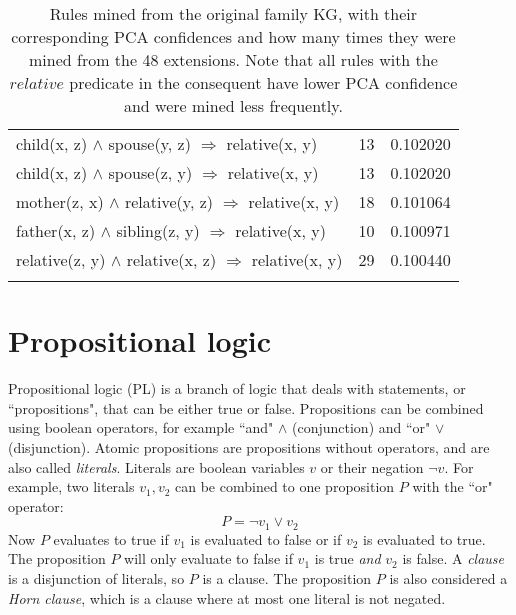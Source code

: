 \begin{longtable}{lrr}
     child(x, z) $\wedge$ spouse(y, z)   $\Rightarrow$ relative(x, y) &           13 &        0.102020 \\
     child(x, z) $\wedge$ spouse(z, y)   $\Rightarrow$ relative(x, y) &           13 &        0.102020 \\
  mother(z, x) $\wedge$ relative(y, z)   $\Rightarrow$ relative(x, y) &           18 &        0.101064 \\
   father(x, z) $\wedge$ sibling(z, y)   $\Rightarrow$ relative(x, y) &           10 &        0.100971 \\
relative(z, y) $\wedge$ relative(x, z)   $\Rightarrow$ relative(x, y) &           29 &        0.100440 \\
\bottomrule
\caption[Rules mined from the original family KG]{Rules mined from the original family KG, with their corresponding PCA confidences and how many times they were mined from the 48 extensions. Note that all rules with the $relative$ predicate in the consequent have lower PCA confidence and were mined less frequently.}
\label{family_original_rules_table_PCA}
\end{longtable}


\section{Propositional logic}
\label{propositional_logic}
Propositional logic (PL) is a branch of logic that deals with statements, or ``propositions", that can be either true or false. Propositions can be combined using boolean operators, for example ``and" $\wedge$ (conjunction) and ``or" $\vee$ (disjunction). Atomic propositions are propositions without operators, and are also called \textit{literals}. Literals are boolean variables $v$ or their negation $\neg v$. For example, two literals $v_1, v_2$ can be combined to one proposition $P$ with the ``or" operator:
\[P = \neg v_1 \vee v_2\]
Now $P$ evaluates to true if $v_1$ is evaluated to false or if $v_2$ is evaluated to true. The proposition $P$ will only evaluate to false if $v_1$ is true \textit{and} $v_2$ is false. A \textit{clause} is a disjunction of literals, so $P$ is a clause. The proposition $P$ is also considered a \textit{Horn clause}, which is a clause where at most one literal is not negated. 

